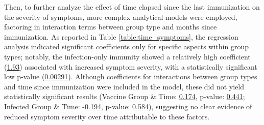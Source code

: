 \documentclass[11pt]{article}
\begin{document}
Then, to further analyze the effect of time elapsed since the last immunization on the severity of symptoms, more complex analytical models were employed, factoring in interaction terms between group type and months since immunization. As reported in Table \ref{table:time_symptoms}, the regression analysis indicated significant coefficients only for specific aspects within group types; notably, the infection-only immunity showed a relatively high coefficient (\hyperlink{B3a}{1.93}) associated with increased symptom severity, with a statistically significant low p-value (\hyperlink{B3d}{0.00291}). Although coefficients for interactions between group types and time since immunization were included in the model, these did not yield statistically significant results (Vaccine Group \& Time: \hyperlink{B5a}{0.174}, p-value: \hyperlink{B5d}{0.441}; Infected Group \& Time: \hyperlink{B6a}{-0.194}, p-value: \hyperlink{B6d}{0.584}), suggesting no clear evidence of reduced symptom severity over time attributable to these factors.
\end{document}
